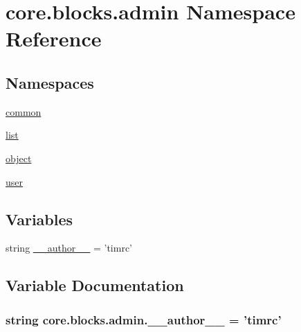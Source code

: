 \hypertarget{namespacecore_1_1blocks_1_1admin}{\section{core.\-blocks.\-admin Namespace Reference}
\label{namespacecore_1_1blocks_1_1admin}
}
\subsection*{Namespaces}
\begin{DoxyCompactItemize}
\item 
\hyperlink{namespacecore_1_1blocks_1_1admin_1_1common}{common}
\item 
\hyperlink{namespacecore_1_1blocks_1_1admin_1_1list}{list}
\item 
\hyperlink{namespacecore_1_1blocks_1_1admin_1_1object}{object}
\item 
\hyperlink{namespacecore_1_1blocks_1_1admin_1_1user}{user}
\end{DoxyCompactItemize}
\subsection*{Variables}
\begin{DoxyCompactItemize}
\item 
string \hyperlink{namespacecore_1_1blocks_1_1admin_aadde964b15b9d7a4abde5732c061ab23}{\-\_\-\-\_\-author\-\_\-\-\_\-} = 'timrc'
\end{DoxyCompactItemize}


\subsection{Variable Documentation}
\hypertarget{namespacecore_1_1blocks_1_1admin_aadde964b15b9d7a4abde5732c061ab23}{
\subsubsection[{\-\_\-\-\_\-author\-\_\-\-\_\-}]{\setlength{\rightskip}{0pt plus 5cm}string core.\-blocks.\-admin.\-\_\-\-\_\-author\-\_\-\-\_\- = 'timrc'}}\label{namespacecore_1_1blocks_1_1admin_aadde964b15b9d7a4abde5732c061ab23}
